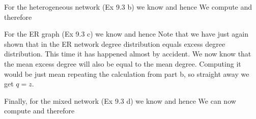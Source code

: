 For the heterogeneous network (Ex 9.3 b) we know
and hence 
We compute 
and therefore

For the ER graph (Ex 9.3 c) we know 
and hence 
Note that we have just again shown that in the ER network degree distribution equals excess degree distribution. This time it has happened almost by accident. We now know that the mean excess degree will also be equal to the mean degree. Computing it would be just mean repeating the calculation from part b, so straight away we get $q=z$.

Finally, for the mixed network (Ex 9.3 d) we know  
and hence 
We can now compute
and therefore
